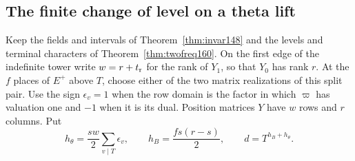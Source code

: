 \documentclass[a4paper,11pt]{article}
\theoremstyle{definition}
\theoremstyle{remark}
\numberwithin{equation}{section}
\begin{document}
\subsection{The finite change of level on a theta lift}\label{nav:VII-28}
Keep the fields and intervals of Theorem~\ref{thm:invar148} and
the levels and terminal characters of Theorem~\ref{thm:twofreq160}.
On the first edge of the indefinite tower write \(w=r+t_{\rm r}\)
for the rank of \(Y_1\), so that \(Y_0\) has rank \(r\).
At the \(f\) places of \(E^+\) above \(T\), choose either of the
two matrix realizations of this split pair. Use the sign
\(\epsilon_v=1\) when the row domain is the factor in which
\(\varpi\) has valuation one and \(-1\) when it is its dual.
Position matrices \(Y\) have \(w\) rows and \(r\) columns. Put
\[
    h_\theta=\frac{sw}{2}\sum_{v\mid T}\epsilon_v,\qquad
    h_B=\frac{fs(r-s)}{2},\qquad d=T^{h_B+h_\theta}.
\]
\end{document}
